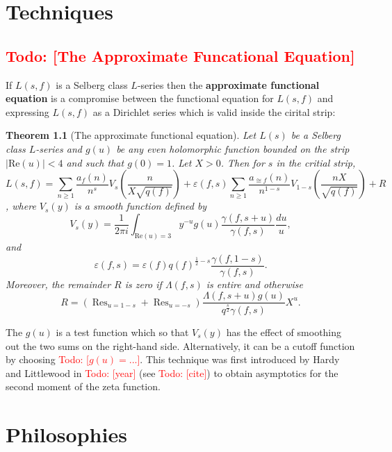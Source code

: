 \documentclass[12pt]{book}
\newtheorem{theorem}{Theorem}[section]
\theoremstyle{definition}\newframedtheorem{method}{Method}
\newcommand{\g}{\gamma}
\renewcommand{\L}{\Lambda}
\newcommand{\e}{\varepsilon}
\newcommand{\<}{\langle}
\renewcommand{\>}{\rangle}
\DeclareMathOperator*{\Res}{\mathrm{Res}}
\renewcommand{\Re}{\mathrm{Re}}
\newcommand{\todo}[1]{\textcolor{red}{\sf Todo: [#1]}}
\begin{document}
\chapter{Techniques}
  \section{\todo{The Approximate Funcational Equation}}
    If $L(s,f)$ is a Selberg class $L$-series then the \textbf{approximate functional equation} is a compromise between the functional equation for $L(s,f)$ and expressing $L(s,f)$ as a Dirichlet series which is valid inside the cirital strip:

    \begin{theorem}[The approximate functional equation]
      Let $L(s)$ be a Selberg class $L$-series and $g(u)$ be any even holomorphic function bounded on the strip $|\Re(u)| < 4$ and such that $g(0) = 1$. Let $X > 0$. Then for $s$ in the critial strip,
      \[
        L(s,f) = \sum_{n \ge 1}\frac{a_{f}(n)}{n^{s}}V_{s}\left(\frac{n}{X\sqrt{q(f)}}\right)+\e(f,s)\sum_{n \ge 1}\frac{a_{\cong{f}}(n)}{n^{1-s}}V_{1-s}\left(\frac{nX}{\sqrt{q(f)}}\right)+R
      \],
      where $V_{s}(y)$ is a smooth function defined by
      \[
        V_{s}(y) = \frac{1}{2\pi i}\int_{\Re(u) = 3}y^{-u}g(u)\frac{\g(f,s+u)}{\g(f,s)}\frac{du}{u},
      \]
      and
      \[
        \e(f,s) = \e(f)q(f)^{\frac{1}{2}-s}\frac{\g(f,1-s)}{\g(f,s)}.
      \]
      Moreover, the remainder $R$ is zero if $\L(f,s)$ is entire and otherwise
      \[
        R = \left(\Res_{u = 1-s}+\Res_{u = -s}\right)\frac{\L(f,s+u)g(u)}{q^{\frac{s}{2}}\g(f,s)}X^{u}.
      \]
    \end{theorem}

    The $g(u)$ is a test function which so that $V_{s}(y)$ has the effect of smoothing out the two sums on the right-hand side. Alternatively, it can be a cutoff function by choosing \todo{$g(u) = ...$}. This technique was first introduced by Hardy and Littlewood in \todo{year} (see \todo{cite}) to obtain asymptotics for the second moment of the zeta function.

\chapter{Philosophies}
\end{document}
